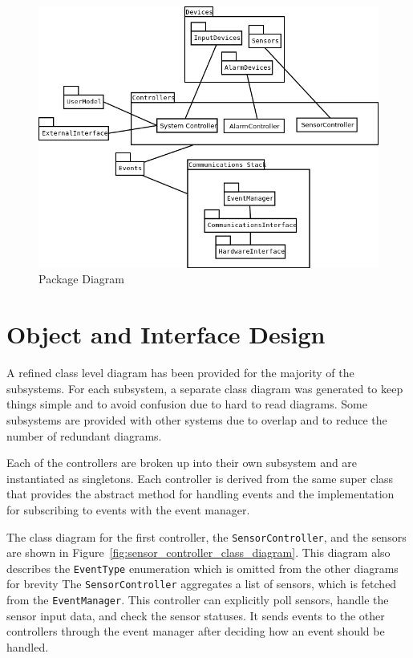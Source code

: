 \documentclass{report}
\begin{document}
\begin{figure}
    \caption{Package Diagram}
    \label{fig:package_diagram}
    \includegraphics[scale=0.5]{package_diagram.png}
\end{figure}

\section{Object and Interface Design}
A refined class level diagram has been provided for the majority of the
subsystems. For each subsystem, a separate class diagram was generated to keep
things simple and to avoid confusion due to hard to read diagrams. Some
subsystems are provided with other systems due to overlap and to reduce the
number of redundant diagrams.

Each of the controllers are broken up into their own subsystem and are
instantiated as singletons. Each controller is derived from the same super class
that provides the abstract method for handling events and the
implementation for subscribing to events with the event manager.

The class diagram for the first controller, the \texttt{SensorController}, and
the sensors are shown in Figure~\ref{fig:sensor_controller_class_diagram}. This
diagram also describes the \texttt{EventType} enumeration which is omitted from
the other diagrams for brevity The \texttt{SensorController} aggregates a list
of sensors, which is fetched from the \texttt{EventManager}. This controller can
explicitly poll sensors, handle the sensor input data, and check the sensor
statuses. It sends events to the other controllers through the event manager
after deciding how an event should be handled. 
\end{document}
